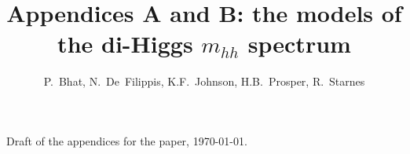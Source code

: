 \documentclass[a4paper,11pt]{article}
\title{Appendices A and B: the models of the di-Higgs $m_{hh}$ spectrum}
\author{P.~Bhat, N.~De~Filippis, K.F.~Johnson, H.B.~Prosper, R.~Starnes}
\affiliation{Fermilab; Politecnico di Bari; Florida State University}
\begin{document}
\maketitle
\ifdefined\HAVEJHEP\else\begin{center}\small Draft of the appendices for the paper, \today.\end{center}\fi
\appendix


\clearpage
\ifdefined\HAVEJHEP\else\fi

\end{document}
